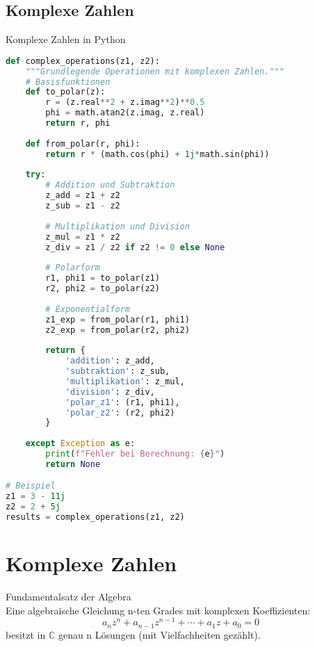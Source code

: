 

\subsection{Komplexe Zahlen}

\begin{examplecode}{Komplexe Zahlen in Python}
\begin{lstlisting}[language=Python, style=basesmol]
def complex_operations(z1, z2):
    """Grundlegende Operationen mit komplexen Zahlen."""
    # Basisfunktionen
    def to_polar(z):
        r = (z.real**2 + z.imag**2)**0.5
        phi = math.atan2(z.imag, z.real)
        return r, phi
    
    def from_polar(r, phi):
        return r * (math.cos(phi) + 1j*math.sin(phi))
    
    try:
        # Addition und Subtraktion
        z_add = z1 + z2
        z_sub = z1 - z2
        
        # Multiplikation und Division
        z_mul = z1 * z2
        z_div = z1 / z2 if z2 != 0 else None
        
        # Polarform
        r1, phi1 = to_polar(z1)
        r2, phi2 = to_polar(z2)
        
        # Exponentialform
        z1_exp = from_polar(r1, phi1)
        z2_exp = from_polar(r2, phi2)
        
        return {
            'addition': z_add,
            'subtraktion': z_sub,
            'multiplikation': z_mul,
            'division': z_div,
            'polar_z1': (r1, phi1),
            'polar_z2': (r2, phi2)
        }
        
    except Exception as e:
        print(f"Fehler bei Berechnung: {e}")
        return None

# Beispiel
z1 = 3 - 11j
z2 = 2 + 5j
results = complex_operations(z1, z2)
\end{lstlisting}
\end{examplecode}

\columnbreak

\section{Komplexe Zahlen}

\begin{lemma}{Fundamentalsatz der Algebra}\\
Eine algebraische Gleichung n-ten Grades mit komplexen Koeffizienten:
$$a_nz^n + a_{n-1}z^{n-1} + \cdots + a_1z + a_0 = 0$$
besitzt in $\mathbb{C}$ genau n Lösungen (mit Vielfachheiten gezählt).
\end{lemma}

